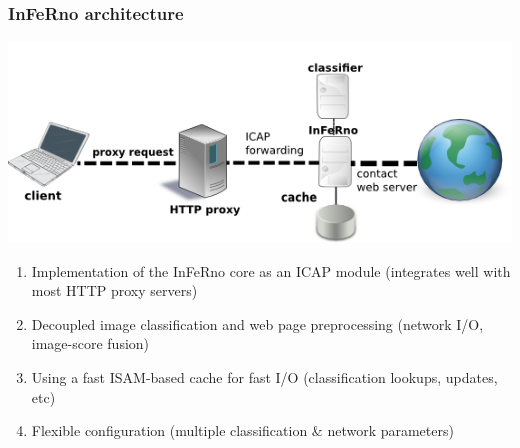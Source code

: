 \documentclass{beamer}
\begin{document}
\begin{frame}
\frametitle{InFeRno architecture}
\begin{center}
	\includegraphics[scale=0.6]{images/network_diagram.png}
	\begin{enumerate}
		\item Implementation of the InFeRno core as an ICAP module (integrates well with most HTTP proxy servers)
		\item Decoupled image classification and web page preprocessing (network I/O, image-score fusion)
		\item Using a fast ISAM-based cache for fast  I/O (classification lookups, updates, etc)
        \item Flexible configuration (multiple classification \& network parameters)
	\end{enumerate}
\end{center}
\end{frame}
\end{document}
